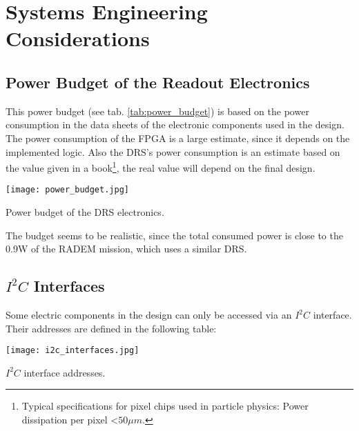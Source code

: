 \section{Systems Engineering Considerations}
\label{sec:systems_engineering}

\subsection{Power Budget of the Readout Electronics}
\label{sec:power_budget}
This power budget (see tab. \ref{tab:power_budget}) is based on the power consumption in the data sheets of the electronic components used in the design.
The power consumption of the FPGA is a large estimate, since it depends on the implemented logic.
Also the DRS's power consumption is an estimate based on the value given in a book\footnote{Typical specifications for pixel chips used in particle physics: Power dissipation per pixel \textless $50\mu m$.\cite{rossi2006pixel}}, the real value will depend on the final design.
\begin{table}[H]
	\centering
    \texttt{[image: power\_budget.jpg]}
    \caption[Power Budget]{Power budget of the DRS electronics.}
	\label{tab:power_budget}
\end{table}

The budget seems to be realistic, since the total consumed power is close to the 0.9W\cite[p. 11, tab. 4]{tantalumproject2016} of the RADEM mission, which uses a similar DRS.

\subsection{\texorpdfstring{$I^2C$}{TEXT} Interfaces}
\label{sec:i2c_interfaces}
Some electric components in the design can only be accessed via an $I^2C$ interface. 
Their addresses are defined in the following table:
\begin{table}[H]
	\centering
    \texttt{[image: i2c\_interfaces.jpg]}
    \caption[$I^2C$ Interfaces]{$I^2C$ interface addresses.}
	\label{tab:i2c_interfaces}
\end{table}

